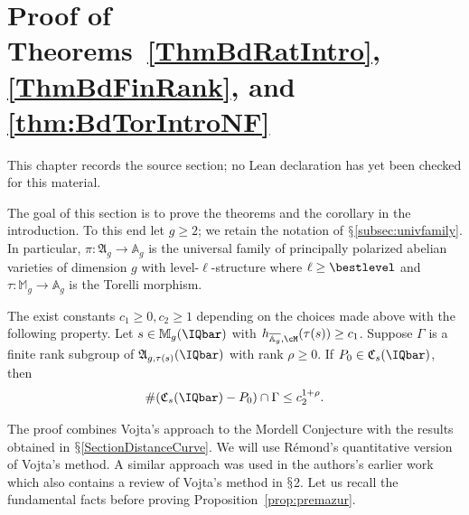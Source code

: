 \chapter{Proof of Theorems~\ref{ThmBdRatIntro}, \ref{ThmBdFinRank}, and \ref{thm:BdTorIntroNF}}
\label{uniformity-mordell-lang-curves-chapter-08}

\begin{remark}
\label{uniformity-mordell-lang-curves-chapter-08-source}
This chapter records the source section; no Lean declaration has yet been checked for this material.
\notready
\end{remark}

\label{SectionRatPt}

The goal of this section is to prove the theorems and the corollary in
the introduction. To this end let $g\ge 2$; we retain the notation of
$\mathsection$\ref{subsec:univfamily}. In particular,
$\pi\colon\mathfrak{A}_g\rightarrow \mathbb{A}_g$ is the universal
family of principally polarized abelian varieties of dimension $g$
with level-$\ell$-structure where $\ell\ge \bestlevel$ and
$\tau\colon \mathbb{M}_g\rightarrow \mathbb{A}_g$ is the Torelli morphism.

\begin{proposition}
\notready
  \label{prop:premazur}
  The exist constants $c_1\ge 0,c_2\ge 1$ depending on the choices made
  above with the following property. Let $s\in \mathbb{M}_g(\IQbar)$
  with $h_{\overline{\mathbb{A}_g},\cM}(\tau(s)) \ge c_1$. Suppose $\Gamma$ is
  a finite rank subgroup of $\mathfrak{A}_{g,\tau(s)}(\IQbar)$ with rank
  $\rho\ge 0$. If $P_0 \in \mathfrak{C}_s(\IQbar)$, then
  $$
    \# (\mathfrak{C}_s(\IQbar)-P_0)\cap \Gamma \le
    c_2^{1+\rho}.
  $$
\end{proposition}


The proof combines Vojta's approach to the Mordell Conjecture with the
results obtained in $\mathsection$\ref{SectionDistanceCurve}. We
will use R\'emond's quantitative
version~\cite{Remond:Decompte,remond:vojtasup} of Vojta's method. A
similar approach was used in the authors's earlier work~\cite{DGH1p}
which also contains a review of Vojta's method in $\mathsection$2. Let
us recall the fundamental facts before proving Proposition~\ref{prop:premazur}.

